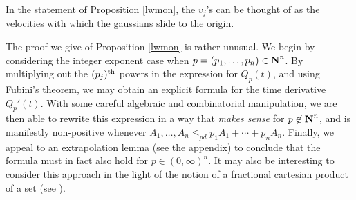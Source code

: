 \begin{remark}
In the statement of Proposition \ref{lwmon},
the $v_j$'s can be thought of as the velocities with which the gaussians slide
to the origin.
\end{remark}

The proof we give of Proposition \ref{lwmon} is rather unusual.
We begin by considering the integer exponent case when $p=(p_1,\hdots,p_n)\in{\hbox{\bf N}}^n$. By
multiplying out the $(p_j)^{{\operatorname{th}}}$ powers in the expression for $Q_p(t)$, and using
Fubini's theorem, we may
obtain an explicit formula for the time derivative $Q_p'(t)$. With some careful
algebraic and combinatorial manipulation, we are then able to rewrite this
expression in a way that \emph{makes sense} for $p\not\in{\hbox{\bf N}}^n$, and is
manifestly non-positive whenever
$A_1, \ldots, A_n \leq_{pd} p_1A_1 + \cdots + p_{n}A_n$. Finally,
we appeal to an extrapolation lemma (see the appendix) to
conclude that the formula must in fact also hold for $p\in(0,\infty)^{n}$.
It may also be interesting to consider this approach in the light of the notion
of a fractional cartesian product of a set (see \cite{Blei}).

